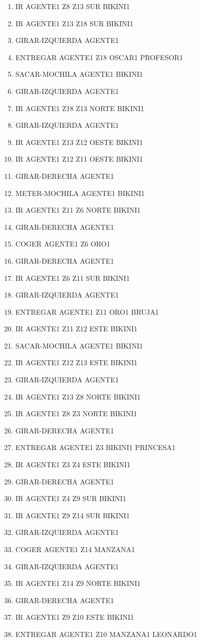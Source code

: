 \documentclass[12pt,a4paper]{article}
\begin{document}
\begin{enumerate}
	\item IR AGENTE1 Z8 Z13 SUR BIKINI1
	\item IR AGENTE1 Z13 Z18 SUR BIKINI1
	\item GIRAR-IZQUIERDA AGENTE1
	\item ENTREGAR AGENTE1 Z18 OSCAR1 PROFESOR1
	\item SACAR-MOCHILA AGENTE1 BIKINI1
	\item GIRAR-IZQUIERDA AGENTE1
	\item IR AGENTE1 Z18 Z13 NORTE BIKINI1
	\item GIRAR-IZQUIERDA AGENTE1
	\item IR AGENTE1 Z13 Z12 OESTE BIKINI1
	\item IR AGENTE1 Z12 Z11 OESTE BIKINI1
	\item GIRAR-DERECHA AGENTE1
	\item METER-MOCHILA AGENTE1 BIKINI1
	\item IR AGENTE1 Z11 Z6 NORTE BIKINI1
	\item GIRAR-DERECHA AGENTE1
	\item COGER AGENTE1 Z6 ORO1
	\item GIRAR-DERECHA AGENTE1
	\item IR AGENTE1 Z6 Z11 SUR BIKINI1
	\item GIRAR-IZQUIERDA AGENTE1
	\item ENTREGAR AGENTE1 Z11 ORO1 BRUJA1
	\item IR AGENTE1 Z11 Z12 ESTE BIKINI1
	\item SACAR-MOCHILA AGENTE1 BIKINI1
	\item IR AGENTE1 Z12 Z13 ESTE BIKINI1
	\item GIRAR-IZQUIERDA AGENTE1
	\item IR AGENTE1 Z13 Z8 NORTE BIKINI1
	\item IR AGENTE1 Z8 Z3 NORTE BIKINI1
	\item GIRAR-DERECHA AGENTE1
	\item ENTREGAR AGENTE1 Z3 BIKINI1 PRINCESA1
	\item IR AGENTE1 Z3 Z4 ESTE BIKINI1
	\item GIRAR-DERECHA AGENTE1
	\item IR AGENTE1 Z4 Z9 SUR BIKINI1
	\item IR AGENTE1 Z9 Z14 SUR BIKINI1
	\item GIRAR-IZQUIERDA AGENTE1
	\item COGER AGENTE1 Z14 MANZANA1
	\item GIRAR-IZQUIERDA AGENTE1
	\item IR AGENTE1 Z14 Z9 NORTE BIKINI1
	\item GIRAR-DERECHA AGENTE1
	\item IR AGENTE1 Z9 Z10 ESTE BIKINI1
	\item ENTREGAR AGENTE1 Z10 MANZANA1 LEONARDO1
\end{enumerate}
\end{document}
